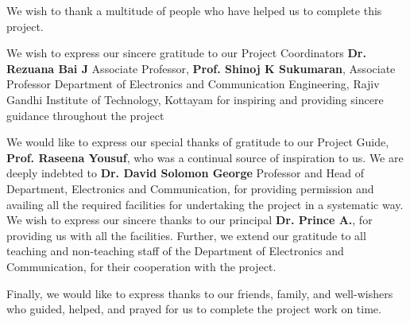 
\begin{center}

    \vspace{6pt}
    \vspace{20pt}

    \begin{minipage} {0.9\textwidth}

        \setlength{\parindent}{10pt}
        \setlength{\parskip}{\baselineskip}

        We wish to thank a multitude of people who have helped us to complete this project.


        We wish to express our sincere gratitude to our Project Coordinators \textbf{Dr. Rezuana Bai J}
        Associate Professor, \textbf{Prof. Shinoj K Sukumaran}, Associate Professor Department of Electronics
        and Communication Engineering, Rajiv Gandhi Institute of Technology, Kottayam
        for inspiring and providing sincere guidance throughout the project


        We would like to express our special thanks of gratitude to our Project Guide,
        \textbf{Prof. Raseena Yousuf}, who was a continual source of inspiration to us. We are
        deeply indebted to \textbf{Dr. David Solomon George} Professor and Head of Department,
        Electronics and Communication, for providing permission and availing all the required
        facilities for undertaking the project in a systematic way. We wish to express our sincere
        thanks to our principal \textbf{Dr. Prince A.}, for providing us with all the facilities. Further,
        we extend our gratitude to all teaching and non-teaching staff of the Department of Electronics
        and Communication, for their cooperation with the project.


        Finally, we would like to express thanks to our friends, family, and well-wishers who
        guided, helped, and prayed for us to complete the project work on time.

    \end{minipage}

\end{center}

\pagebreak
